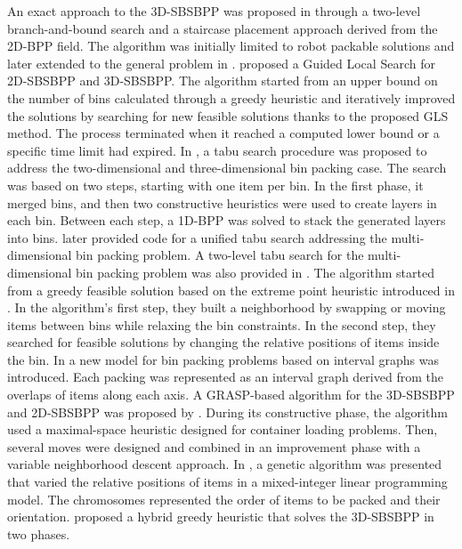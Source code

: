 An exact approach to the 3D-SBSBPP was proposed in \cite{martello2000three} through a two-level branch-and-bound search and a staircase placement approach derived from the 2D-BPP field.
The algorithm was initially limited to robot packable solutions and later extended to the general problem in \cite{martello2007exact}.
\cite{faroe2003guided} proposed a Guided Local Search for 2D-SBSBPP and 3D-SBSBPP.
The algorithm started from an upper bound on the number of bins calculated through a greedy heuristic and iteratively improved the solutions by searching for new feasible solutions thanks to the proposed GLS method.
The process terminated when it reached a computed lower bound or a specific time limit had expired.
In \cite{lodi2002heuristic}, a tabu search procedure was proposed to address the two-dimensional and three-dimensional bin packing case.
The search was based on two steps, starting with one item per bin.
In the first phase, it merged bins, and then two constructive heuristics were used to create layers in each bin.
Between each step, a 1D-BPP was solved to stack the generated layers into bins.
\cite{Lodi2004} later provided code for a unified tabu search addressing the multi-dimensional bin packing problem.
A two-level tabu search for the multi-dimensional bin packing problem was also provided in \cite{crainic2009ts2pack}.
The algorithm started from a greedy feasible solution based on the extreme point heuristic introduced in \cite{crainic2008extreme}.
In the algorithm's first step, they built a neighborhood by swapping or moving items between bins while relaxing the bin constraints.
In the second step, they searched for feasible solutions by changing the relative positions of items inside the bin. %
In \cite{fekete2004combinatorial} a new model for bin packing problems based on interval graphs was introduced. 
Each packing was represented as an interval graph derived from the overlaps of items along each axis.
A GRASP-based algorithm for the 3D-SBSBPP and 2D-SBSBPP was proposed by \cite{parreno2010hybrid}. During its constructive phase, the algorithm used a maximal-space heuristic designed for container loading problems.
Then, several moves were designed and combined in an improvement phase with a variable neighborhood descent approach.
In \cite{WU2010347}, a genetic algorithm was presented that varied the relative positions of items in a mixed-integer linear programming model. The chromosomes represented the order of items to be packed and their orientation.
\cite{hifi2014hybrid} proposed a hybrid greedy heuristic that solves the 3D-SBSBPP in two phases.
